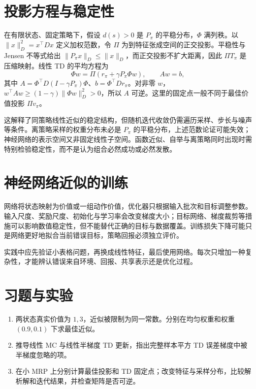 \section{投影方程与稳定性}

在有限状态、固定策略下，假设 $d(s)>0$ 是 $P_\pi$ 的平稳分布，$\Phi$ 满列秩。以 $\|x\|_D^2=x^\top Dx$ 定义加权范数，令 $\Pi$ 为到特征张成空间的正交投影。平稳性与 Jensen 不等式给出 $\|P_\pi x\|_D\leq\|x\|_D$，而正交投影不扩大距离，因此 $\Pi T_\pi$ 是压缩映射。线性 TD 的平均方程为
\[
\Phi w=\Pi(r_\pi+\gamma P_\pi\Phi w),\qquad
Aw=b,
\]
其中 $A=\Phi^\top D(I-\gamma P_\pi)\Phi$、$b=\Phi^\top Dr_\pi$。对非零 $w$，$w^\top Aw\geq(1-\gamma)\|\Phi w\|_D^2>0$，所以 $A$ 可逆。这里的固定点一般不同于最佳价值投影 $\Pi v_\pi$。

这解释了同策略线性近似的稳定结构，但随机迭代收敛仍需遍历采样、步长与噪声等条件。离策略采样的权重分布未必是 $P_\pi$ 的平稳分布，上述范数论证可能失效；神经网络的表示空间又非固定线性子空间。函数近似、自举与离策略同时出现时需特别检验稳定性，而不是认为组合必然成功或必然发散。

\section{神经网络近似的训练}

网络将状态映射为价值或一组动作价值，优化器只根据输入批次和目标调整参数。输入尺度、奖励尺度、初始化与学习率会改变梯度大小；目标网络、梯度裁剪等措施可以影响数值稳定性，但不能替代正确的目标与数据覆盖。训练损失下降可能只是网络更好地拟合当前错误目标，策略回报必须独立评价。

实践中应先验证小表格问题，再换成线性特征，最后使用网络。每次只增加一种复杂性，才能辨认错误来自环境、回报、共享表示还是优化过程。

\section{习题与实验}
\begin{enumerate}
\item 两状态真实价值为 $1,3$，近似被限制为同一常数。分别在均匀权重和权重 $(0.9,0.1)$ 下求最佳近似。
\item 推导线性 MC 与线性半梯度 TD 更新，指出完整样本平方 TD 误差梯度中被半梯度忽略的项。
\item 在小 MRP 上分别计算最佳投影和 TD 固定点；改变特征与采样分布，比较解析解和迭代结果，并检查矩阵是否可逆。
\end{enumerate}





